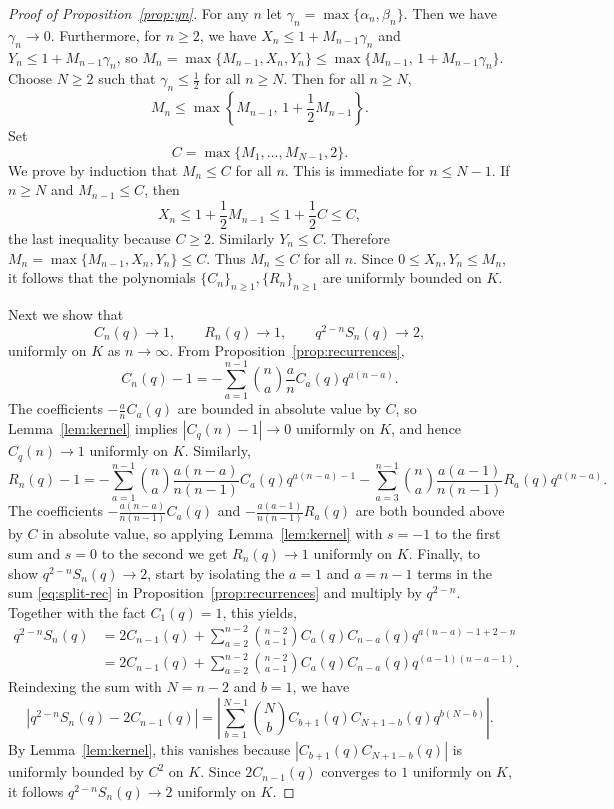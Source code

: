 \documentclass[12pt]{amsart}
\theoremstyle{definition}
\begin{document}
\begin{proof}[Proof of Proposition~\ref{prop:yn}]
For any $n$ let $\gamma_n=\max\{\alpha_n,\beta_n\}.$ Then we have $\gamma_n\to 0$. Furthermore, for $n\ge 2$, we have $X_n\le 1+M_{n-1}\gamma_n$ and $Y_n\le 1+M_{n-1}\gamma_n$, so $M_n=\max\{M_{n-1},X_n,Y_n\}\le \max\{M_{n-1},\,1+M_{n-1}\gamma_n\}.$ Choose $N \geq 2$ such that \(\gamma_n\le \tfrac12\) for all \(n\ge N\). Then for all \(n\ge N\),
\[
M_n\le \max\left\{M_{n-1},\,1+\frac12 M_{n-1}\right\}.
\]
Set
\[
C=\max\{M_1,\dots,M_{N-1},2\}.
\]
We prove by induction that $M_n\le C$ for all $n$. This is immediate for $n\le N-1$. If $n\ge N$ and $M_{n-1}\le C$, then
\[
X_n\le 1+\frac12 M_{n-1}\le 1+\frac12 C\le C,
\]
the last inequality because $C \geq 2$. Similarly $Y_n\le C$. Therefore $M_n=\max\{M_{n-1},X_n,Y_n\}\le C.$ Thus $M_n\le C$ for all $n$. Since $0\le X_n,Y_n\le M_n$, it follows that the polynomials $\{C_n\}_{n \geq 1},\{R_n\}_{n \geq 1}$ are uniformly bounded on $K$.

Next we show that
\[
C_n(q) \to 1, \qquad R_n(q) \to 1, \qquad q^{2-n}S_n(q) \to 2,
\]
uniformly on $K$ as $n \to \infty$. From Proposition~\ref{prop:recurrences},
\[
C_n(q)-1=-\sum_{a=1}^{n-1}\binom{n}{a}\frac{a}{n}C_a(q)q^{a(n-a)}.
\]
The coefficients $-\frac{a}{n}C_a(q)$ are bounded in absolute value by $C$, so Lemma~\ref{lem:kernel} implies $|C_q(n)-1| \to 0$ uniformly on $K$, and hence $C_q(n) \to 1$ uniformly on $K$. Similarly,
\[
R_n(q)-1 = -\sum_{a=1}^{n-1} \binom{n}{a} \frac{a(n-a)}{n(n-1)}C_a(q)q^{a(n-a)-1} - \sum_{a=3}^{n-1} \binom{n}{a} \frac{a(a-1)}{n(n-1)}R_a(q)q^{a(n-a)}.
\]
The coefficients $-\frac{a(n-a)}{n(n-1)}C_a(q)$ and $-\frac{a(a-1)}{n(n-1)}R_a(q)$ are both bounded above by $C$ in absolute value, so applying Lemma~\ref{lem:kernel} with $s=-1$ to the first sum and $s=0$ to the second we get $R_n(q) \to 1$ uniformly on $K$. Finally, to show $q^{2-n}S_n(q) \to 2$, start by isolating the $a=1$ and $a=n-1$ terms in the sum \eqref{eq:split-rec} in Proposition~\ref{prop:recurrences} and multiply by $q^{2-n}$. Together with the fact $C_1(q)=1$, this yields,
\begin{align*}
q^{2-n}S_n(q) &= 2C_{n-1}(q) + \sum_{a=2}^{n-2} \binom{n-2}{a-1} C_a(q)C_{n-a}(q)q^{a(n-a)-1+2-n} \\
&= 2C_{n-1}(q) + \sum_{a=2}^{n-2} \binom{n-2}{a-1} C_a(q)C_{n-a}(q)q^{(a-1)(n-a-1)}.
\end{align*}
Reindexing the sum with $N=n-2$ and $b=1$, we have 
\[
\left|q^{2-n}S_n(q)-2C_{n-1}(q)\right|=\left|\sum_{b=1}^{N-1} \binom{N}{b} C_{b+1}(q)C_{N+1-b}(q)q^{b(N-b)}\right|.
\]
By Lemma~\ref{lem:kernel}, this vanishes because $|C_{b+1}(q)C_{N+1-b}(q)|$ is uniformly bounded by $C^2$ on $K$. Since $2C_{n-1}(q)$ converges to $1$ uniformly on $K$, it follows $q^{2-n}S_n(q) \to 2$ uniformly on $K$. 


\end{proof}
\end{document}
